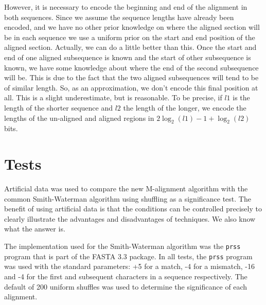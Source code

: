 \documentclass[letterpaper,11pt,oneside]{article}
\begin{document}
However, it is necessary to encode the beginning and end of the alignment in
both sequences.  Since we assume the sequence lengths have already been
encoded, and we have no other prior knowledge on where the aligned section
will be in each sequence we use a uniform prior on the start and end position
of the aligned section.  Actually, we can do a little better than this.  Once
the start and end of one aligned subsequence is known and the start of other
subsequence is known, we have some knowledge about where the end of the second
subsequence will be.  This is due to the fact that the two aligned
subsequences will tend to be of similar length.  So, as an approximation, we
don't encode this final position at all.  This is a slight underestimate, but
is reasonable.  To be precise, if $l1$ is the length of the shorter sequence
and $l2$ the length of the longer, we encode the lengths of the un-aligned and
aligned regions in $2\log_2(l1) - 1 + \log_2(l2)$ bits.



\section{Tests}

Artificial data was used to compare the new M-alignment algorithm with the
common Smith-Waterman algorithm using shuffling as a significance test.  The
benefit of using artificial data is that the conditions can be controlled
precisely to clearly illustrate the advantages and disadvantages of
techniques.
We also know what the answer is.

The implementation used for the Smith-Waterman algorithm was the \verb!prss!
program that is part of the FASTA 3.3 package.  In all tests, the \verb!prss!
program was used with the standard parameters: +5 for a match, -4 for a
mismatch, -16 and -4 for the first and subsequent characters in a sequence
respectively.  The default of 200 uniform shuffles was used to determine the
significance of each alignment.
\end{document}
